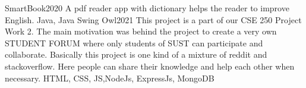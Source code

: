 %
%
%


\begin{projects}

				
	\project
	{SmartBook}{2020}
	{}
	{A pdf reader app with dictionary helps the reader
to improve English.}
	{Java, Java Swing}
	\project
	{Owl}{2021}
	{}
	{This project is a part of our CSE 250 Project Work 2. The main motivation was behind the project to create a very own STUDENT FORUM where only students of SUST can
participate and collaborate. Basically this project is one kind of a mixture of reddit and stackoverflow. Here people can share their knowledge and help each other when necessary.}
	{HTML, CSS, JS,NodeJs, ExpressJs, MongoDB}

\end{projects}